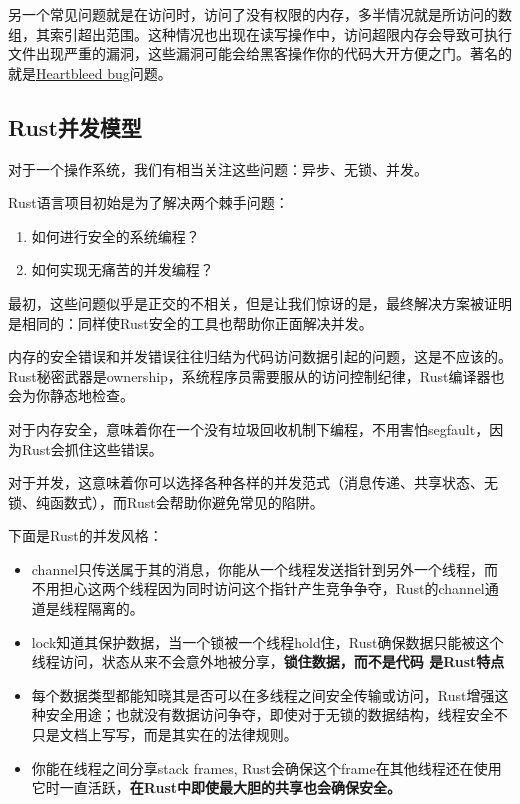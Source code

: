 \documentclass[12pt, a4paper]{article}
\begin{document}
	另一个常见问题就是在访问时，访问了没有权限的内存，多半情况就是所访问的数组，其索引超出范围。这种情况也出现在读写操作中，访问超限内存会导致可执行文件出现严重的漏洞，这些漏洞可能会给黑客操作你的代码大开方便之门。著名的就是\href{https://tonyarcieri.com/would-rust-have-prevented-heartbleed-another-look}{Heartbleed bug}问题。
	
	\subsection{Rust并发模型}
	对于一个操作系统，我们有相当关注这些问题：异步、无锁、并发。
	
	Rust语言项目初始是为了解决两个棘手问题：
	\begin{enumerate}
	\item 如何进行安全的系统编程？
	
	\item 如何实现无痛苦的并发编程？
	\end{enumerate}
	最初，这些问题似乎是正交的不相关，但是让我们惊讶的是，最终解决方案被证明是相同的：同样使Rust安全的工具也帮助你正面解决并发。
	
	内存的安全错误和并发错误往往归结为代码访问数据引起的问题，这是不应该的。Rust秘密武器是ownership，系统程序员需要服从的访问控制纪律，Rust编译器也会为你静态地检查。
	
	对于内存安全，意味着你在一个没有垃圾回收机制下编程，不用害怕segfault，因为Rust会抓住这些错误。
	
	对于并发，这意味着你可以选择各种各样的并发范式（消息传递、共享状态、无锁、纯函数式），而Rust会帮助你避免常见的陷阱。
	
	下面是Rust的并发风格：
	
	\begin{itemize}
	\item channel只传送属于其的消息，你能从一个线程发送指针到另外一个线程，而不用担心这两个线程因为同时访问这个指针产生竞争争夺，Rust的channel通道是线程隔离的。
	\item lock知道其保护数据，当一个锁被一个线程hold住，Rust确保数据只能被这个线程访问，状态从来不会意外地被分享，\textbf{锁住数据，而不是代码 是Rust特点}
	\item 每个数据类型都能知晓其是否可以在多线程之间安全传输或访问，Rust增强这种安全用途；也就没有数据访问争夺，即使对于无锁的数据结构，线程安全不只是文档上写写，而是其实在的法律规则。
	\item 你能在线程之间分享stack frames, Rust会确保这个frame在其他线程还在使用它时一直活跃，\textbf{在Rust中即使最大胆的共享也会确保安全。}
	\end{itemize}
	
\end{document}
